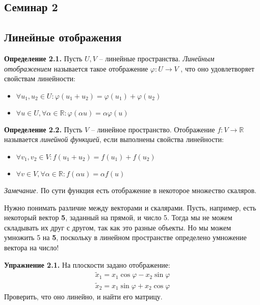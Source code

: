 \documentclass[a4paper, 12pt]{article}
\begin{document}
\begin{spacing}{1.5}
\setlength{\parindent}{0ex}
\setlength{\abovedisplayskip}{11pt}
\setlength{\belowdisplayskip}{11pt}

\section*{Семинар 2}


\subsection*{Линейные отображения}

\textbf{Определение 2.1.} 
Пусть $U, V$ -- линейные пространства. \textit{Линейным отображением} называется такое отображение $\varphi: U \rightarrow V$ , что оно удовлетворяет свойствам линейности:
\begin{itemize} [noitemsep]
    \item $\forall u_1, u_2 \in U: \varphi(u_1 + u_2) = \varphi(u_1) + \varphi(u_2)$
    \item $\forall u \in U, \forall \alpha \in \mathbb{R}: \varphi(\alpha u) = \alpha \varphi(u)$
\end{itemize}

\textbf{Определение 2.2.} 
Пусть $V$ -- линейное пространство. Отображение $f: V \rightarrow \mathbb{R}$ называется \textit{линейной функцией}, если выполнены свойства линейности:
\begin{itemize} [noitemsep]
    \item $\forall v_1, v_2 \in V: f(u_1 + u_2) = f(u_1) + f(u_2)$
    \item $\forall v \in V, \forall \alpha \in \mathbb{R}: f(\alpha u) = \alpha f(u)$
\end{itemize}

\textit{Замечание.} По сути функция есть отображение в некоторое множество скаляров.

Нужно понимать различие между векторами и скалярами. Пусть, например, есть некоторый вектор \textbf{5}, заданный на прямой, и число 5. Тогда мы не можем складывать их друг с другом, так как это разные объекты. Но мы можем умножить 5 на \textbf{5}, поскольку в линейном пространстве определено умножение вектора на число!

\textbf{Упражнение 2.1.} На плоскости задано отображение:
\begin{align*}
    \tilde{x}_1 = x_1 \cos \varphi - x_2 \sin \varphi \\
    \tilde{x}_2 = x_1 \sin \varphi + x_2 \cos \varphi 
\end{align*}
Проверить, что оно линейно, и найти его матрицу.


\end{spacing}
\end{document}
